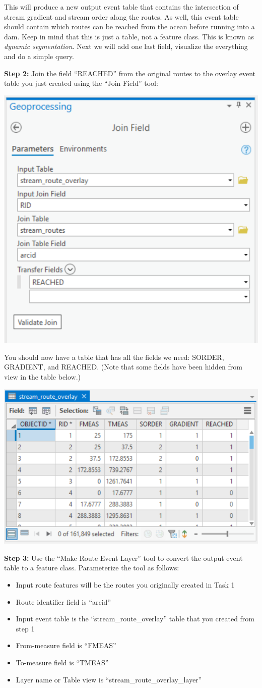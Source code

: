 \documentclass[
]{book}
\begin{document}
This will produce a new output event table that contains the intersection of stream gradient and stream order along the routes. As well, this event table should contain which routes can be reached from the ocean before running into a dam. Keep in mind that this is just a table, not a feature class. This is known as \emph{dynamic segmentation}. Next we will add one last field, visualize the everything and do a simple query.

\textbf{Step 2:} Join the field ``REACHED'' from the original routes to the overlay event table you just created using the ``Join Field'' tool:

\includegraphics[width=0.5\linewidth]{images/02-join-field}

You should now have a table that has all the fields we need: SORDER, GRADIENT, and REACHED. (Note that some fields have been hidden from view in the table below.)

\includegraphics[width=0.75\linewidth]{images/02-stream-route-overlay}

\textbf{Step 3:} Use the ``Make Route Event Layer'' tool to convert the output event table to a feature class. Parameterize the tool as follows:

\begin{itemize}
\item
  Input route features will be the routes you originally created in Task 1
\item
  Route identifier field is ``arcid''
\item
  Input event table is the ``stream\_route\_overlay'' table that you created from step 1
\item
  From-measure field is ``FMEAS''
\item
  To-measure field is ``TMEAS''
\item
  Layer name or Table view is ``stream\_route\_overlay\_layer''
\end{itemize}
\end{document}
